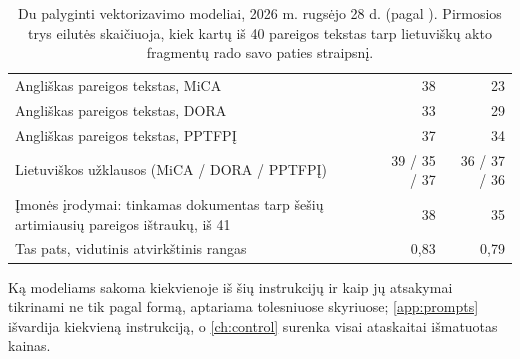 \begin{table}[H]
\caption{Du palyginti vektorizavimo modeliai, 2026 m. rugsėjo 28 d. (pagal ). Pirmosios trys eilutės skaičiuoja, kiek kartų iš 40 pareigos tekstas tarp lietuviškų akto fragmentų rado savo paties straipsnį.}\label{tab:models:embedcompare}
\begin{tabularx}{\textwidth}{@{}Yrr@{}}
\toprule
{} &  &  \\
\midrule
Angliškas pareigos tekstas, MiCA & 38 & 23 \\
Angliškas pareigos tekstas, DORA & 33 & 29 \\
Angliškas pareigos tekstas, PPTFPĮ & 37 & 34 \\
Lietuviškos užklausos (MiCA / DORA / PPTFPĮ) & 39 / 35 / 37 & 36 / 37 / 36 \\
Įmonės įrodymai: tinkamas dokumentas tarp šešių artimiausių pareigos ištraukų, iš 41 & 38 & 35 \\
Tas pats, vidutinis atvirkštinis rangas & 0,83 & 0,79 \\
\bottomrule
\end{tabularx}
\end{table}

Ką modeliams sakoma kiekvienoje iš šių instrukcijų ir kaip jų atsakymai tikrinami ne tik pagal formą,
aptariama tolesniuose skyriuose; \cref{app:prompts} išvardija kiekvieną instrukciją, o
\cref{ch:control} surenka visai ataskaitai išmatuotas kainas.
